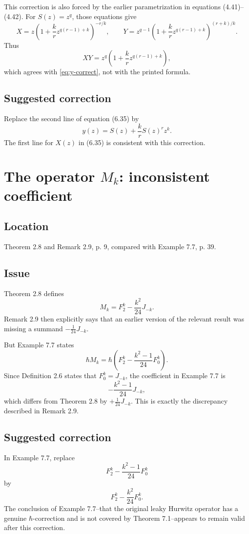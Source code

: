 \documentclass[11pt]{article}
\begin{document}
This correction is also forced by the earlier parametrization in equations (4.41)--(4.42).  For $S(z)=z^q$, those equations give
\[
   X=z\left(1+\frac{k}{r}z^{q(r-1)+k}\right)^{-r/k},
   \qquad
   Y=z^{q-1}\left(1+\frac{k}{r}z^{q(r-1)+k}\right)^{(r+k)/k}.
\]
Thus
\[
   XY=z^q\left(1+\frac{k}{r}z^{q(r-1)+k}\right),
\]
which agrees with \eqref{eq:y-correct}, not with the printed formula.

\subsection*{Suggested correction}
Replace the second line of equation (6.35) by
\[
   y(z)=S(z)+\frac{k}{r}S(z)^r z^k.
\]
The first line for $X(z)$ in (6.35) is consistent with this correction.

\section{The operator $M_k$: inconsistent coefficient}

\subsection*{Location}
Theorem 2.8 and Remark 2.9, p. 9, compared with Example 7.7, p. 39.

\subsection*{Issue}
Theorem 2.8 defines
\[
   M_k=F^k_2-\frac{k^2}{24}J_{-k}.
\]
Remark 2.9 then explicitly says that an earlier version of the relevant result was missing a summand $-\frac{1}{24}J_{-k}$.

But Example 7.7 states
\[
   \hbar M_k=\hbar\left(F^k_2-\frac{k^2-1}{24}F^k_0\right).
\]
Since Definition 2.6 states that $F^k_0=J_{-k}$, the coefficient in Example 7.7 is
\[
   -\frac{k^2-1}{24}J_{-k},
\]
which differs from Theorem 2.8 by $+\frac{1}{24}J_{-k}$.  This is exactly the discrepancy described in Remark 2.9.

\subsection*{Suggested correction}
In Example 7.7, replace
\[
   F^k_2-\frac{k^2-1}{24}F^k_0
\]
by
\[
   F^k_2-\frac{k^2}{24}F^k_0.
\]
The conclusion of Example 7.7--that the original leaky Hurwitz operator has a genuine $\hbar$-correction and is not covered by Theorem 7.1--appears to remain valid after this correction.
\end{document}
